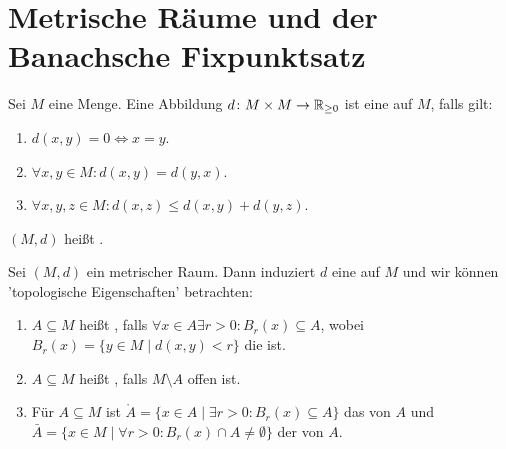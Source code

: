 \chapter{Metrische R\"aume und der Banachsche Fixpunktsatz}
\begin{definition}
	Sei $ M $ eine Menge. Eine Abbildung $ d\colon M\times M\rightarrow\mathbb{R}_{\geq 0} $ ist eine  auf $ M $, falls gilt:
	\begin{enumerate}
		\item $ d(x,y)=0\Leftrightarrow x=y $.
		\item $ \forall x,y\in M\colon d(x,y)=d(y,x) $.
		\item $ \forall x,y,z\in M: d(x,z)\leq d(x,y)+d(y,z) $.
	\end{enumerate}
	$ (M,d) $ hei\ss t .
\end{definition}
\begin{definition}
	Sei $ (M,d) $ ein metrischer Raum. Dann induziert $ d $ eine  auf $ M $ und wir k\"onnen 'topologische Eigenschaften' betrachten:
	\begin{enumerate}
		\item $ A\subseteq M $ hei\ss t , falls $ \forall x\in A\exists r>0:B_r(x)\subseteq A  $, wobei $ B_r(x)=\lbrace y\in M\mid d(x,y)<r\rbrace $ die  ist.
		\item $ A\subseteq M $ hei\ss t , falls $ M\setminus A $ offen ist.
		\item F\"ur $ A\subseteq M $ ist $ \mathring A=\lbrace x\in A\mid \exists r>0: B_r(x)\subseteq A\rbrace $ das  von $ A $ und $ \bar A=\lbrace x\in M\mid\forall r>0:B_r(x)\cap A\neq\emptyset\rbrace $ der  von $ A $.  
	\end{enumerate}
\end{definition}
